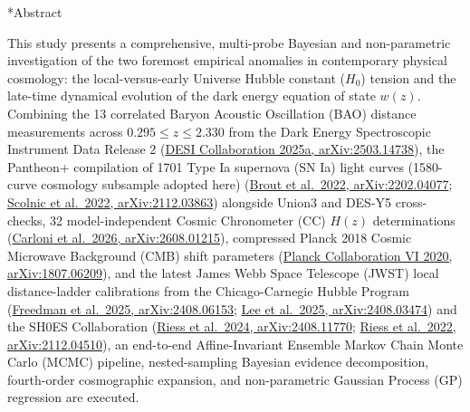\documentclass[11pt,letterpaper]{article}
\makeatletter
\renewcommand{\section}{\@startsection{section}{1}{\z@}%
  {-16pt \@plus -4pt \@minus -2pt}%
  {8pt \@plus 2pt}%
  {\normalfont\Large\bfseries\color{primary}}}
\let\orig@section\section
\renewcommand{\section}{\@ifstar{\star@section}{\nostar@section}}
\newcommand{\nostar@section}[1]{%
  \orig@section{#1}%
  \vspace{-6pt}\noindent{\color{tealaccent}\rule{\textwidth}{1.5pt}}\vspace{4pt}\par\nobreak%
}
\newcommand{\star@section}[1]{%
  \orig@section*{#1}%
  \vspace{-6pt}\noindent{\color{tealaccent}\rule{\textwidth}{1.5pt}}\vspace{4pt}\par\nobreak%
}
\makeatother
\begin{document}
\listoffigures
\vspace{14pt}
\listoftables
\clearpage

\section*{Abstract}

{\small
This study presents a comprehensive, multi-probe Bayesian and non-parametric investigation of the two foremost empirical anomalies in contemporary physical cosmology: the local-versus-early Universe Hubble constant ($H_0$) tension and the late-time dynamical evolution of the dark energy equation of state $w(z)$. Combining the 13 correlated Baryon Acoustic Oscillation (BAO) distance measurements across $0.295 \le z \le 2.330$ from the Dark Energy Spectroscopic Instrument Data Release 2 (\href{https://arxiv.org/abs/2503.14738}{DESI Collaboration 2025a, arXiv:2503.14738}), the Pantheon+ compilation of 1701 Type Ia supernova (SN Ia) light curves (1580-curve cosmology subsample adopted here) (\href{https://arxiv.org/abs/2202.04077}{Brout et al.\ 2022, arXiv:2202.04077}; \href{https://arxiv.org/abs/2112.03863}{Scolnic et al.\ 2022, arXiv:2112.03863}) alongside Union3 and DES-Y5 cross-checks, 32 model-independent Cosmic Chronometer (CC) $H(z)$ determinations (\href{https://arxiv.org/pdf/2608.01215}{Carloni et al.\ 2026, arXiv:2608.01215}), compressed Planck 2018 Cosmic Microwave Background (CMB) shift parameters (\href{https://arxiv.org/abs/1807.06209}{Planck Collaboration VI 2020, arXiv:1807.06209}), and the latest James Webb Space Telescope (JWST) local distance-ladder calibrations from the Chicago-Carnegie Hubble Program (\href{https://arxiv.org/abs/2408.06153}{Freedman et al.\ 2025, arXiv:2408.06153}; \href{https://arxiv.org/abs/2408.03474}{Lee et al.\ 2025, arXiv:2408.03474}) and the SH0ES Collaboration (\href{https://arxiv.org/abs/2408.11770}{Riess et al.\ 2024, arXiv:2408.11770}; \href{https://arxiv.org/pdf/2112.04510}{Riess et al.\ 2022, arXiv:2112.04510}), an end-to-end Affine-Invariant Ensemble Markov Chain Monte Carlo (MCMC) pipeline, nested-sampling Bayesian evidence decomposition, fourth-order cosmographic expansion, and non-parametric Gaussian Process (GP) regression are executed.

}
\end{document}

